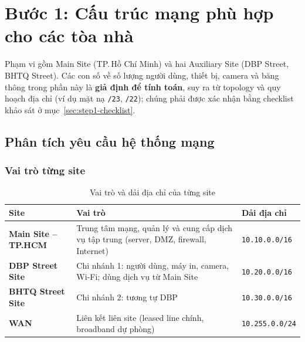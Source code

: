 \section{Bước 1: Cấu trúc mạng phù hợp cho các tòa nhà}
\label{sec:step1}

Phạm vi gồm Main Site (TP.\,Hồ Chí Minh) và hai Auxiliary Site (DBP Street, BHTQ Street). Các con số về số lượng người dùng, thiết bị, camera và băng thông trong phần này là \textbf{giả định để tính toán}, suy ra từ topology và quy hoạch địa chỉ (ví dụ mặt nạ \texttt{/23}, \texttt{/22}); chúng phải được xác nhận bằng checklist khảo sát ở mục~\ref{sec:step1-checklist}.

\subsection{Phân tích yêu cầu hệ thống mạng}

\subsubsection{Vai trò từng site}
\begin{small}
\setlength{\tabcolsep}{4pt}
\begin{longtable}{|p{3.0cm}|p{7.6cm}|p{3.2cm}|}
\caption{Vai trò và dải địa chỉ của từng site} \label{tab:site_roles} \\
\hline
\textbf{Site} & \textbf{Vai trò} & \textbf{Dải địa chỉ} \\ \hline
\endhead
\textbf{Main Site -- TP.HCM} & Trung tâm mạng, quản lý và cung cấp dịch vụ tập trung (server, DMZ, firewall, Internet) & \texttt{10.10.0.0/16} \\ \hline
\textbf{DBP Street Site} & Chi nhánh 1: người dùng, máy in, camera, Wi-Fi; dùng dịch vụ từ Main Site & \texttt{10.20.0.0/16} \\ \hline
\textbf{BHTQ Street Site} & Chi nhánh 2: tương tự DBP & \texttt{10.30.0.0/16} \\ \hline
\textbf{WAN} & Liên kết liên site (leased line chính, broadband dự phòng) & \texttt{10.255.0.0/24} \\ \hline
\end{longtable}
\end{small}

